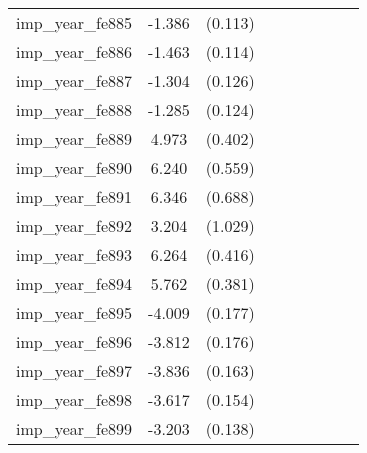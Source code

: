{\begin{tabular}{l*{4}{cc}}
imp\_year\_fe885&   -1.386\sym{***}&  (0.113)&                  &         &                  &         &                  &         \\
imp\_year\_fe886&   -1.463\sym{***}&  (0.114)&                  &         &                  &         &                  &         \\
imp\_year\_fe887&   -1.304\sym{***}&  (0.126)&                  &         &                  &         &                  &         \\
imp\_year\_fe888&   -1.285\sym{***}&  (0.124)&                  &         &                  &         &                  &         \\
imp\_year\_fe889&    4.973\sym{***}&  (0.402)&                  &         &                  &         &                  &         \\
imp\_year\_fe890&    6.240\sym{***}&  (0.559)&                  &         &                  &         &                  &         \\
imp\_year\_fe891&    6.346\sym{***}&  (0.688)&                  &         &                  &         &                  &         \\
imp\_year\_fe892&    3.204\sym{**} &  (1.029)&                  &         &                  &         &                  &         \\
imp\_year\_fe893&    6.264\sym{***}&  (0.416)&                  &         &                  &         &                  &         \\
imp\_year\_fe894&    5.762\sym{***}&  (0.381)&                  &         &                  &         &                  &         \\
imp\_year\_fe895&   -4.009\sym{***}&  (0.177)&                  &         &                  &         &                  &         \\
imp\_year\_fe896&   -3.812\sym{***}&  (0.176)&                  &         &                  &         &                  &         \\
imp\_year\_fe897&   -3.836\sym{***}&  (0.163)&                  &         &                  &         &                  &         \\
imp\_year\_fe898&   -3.617\sym{***}&  (0.154)&                  &         &                  &         &                  &         \\
imp\_year\_fe899&   -3.203\sym{***}&  (0.138)&                  &         &                  &         &                  &         \\

\end{tabular}}
